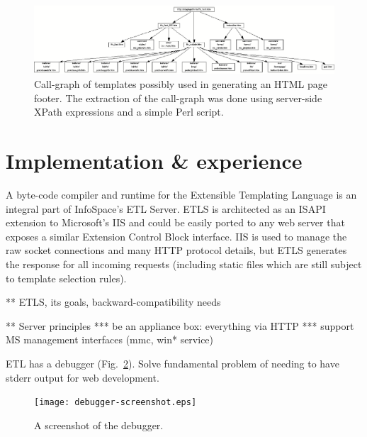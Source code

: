 \documentclass{www2003-submission}
\newcommand{\figref}[1]{Fig.~\ref{fig-#1}}
\begin{document}
\begin{figure}[bt]
\begin{centering}
\hspace*{-.03\linewidth}\includegraphics[width=1.06\linewidth]{ftr_fast-call-graph.eps}
\caption{Call-graph of templates possibly used in generating an HTML
page footer.  The extraction of the call-graph was done using
server-side XPath expressions and a simple Perl script. \label{fig-call-graph}}
\end{centering}
\end{figure}


\section{Implementation \& experience}
\label{sec-implementation}

A byte-code compiler and runtime for the Extensible Templating Language is
an integral part of InfoSpace's ETL Server.  ETLS is architected as an
ISAPI extension to Microsoft's IIS and could be easily ported to any
web server that exposes a similar Extension Control Block interface.
IIS is used to manage the raw socket connections and many HTTP
protocol details, but ETLS generates the response for all incoming
requests (including static files which are still subject to template
selection rules).

** ETLS, its goals, backward-compatibility needs

** Server principles
*** be an appliance box: everything via HTTP
*** support MS management interfaces (mmc, win* service)

ETL has a debugger (\figref{debugger-screenshot}).  Solve fundamental
problem of needing to have stderr output for web development.


\begin{figure}[tb]
\begin{centering}
\hspace*{-0.03\linewidth}\texttt{[image: debugger-screenshot.eps]}
\caption{A screenshot of the debugger.
\label{fig-debugger-screenshot}}
\end{centering}
\end{figure}
\end{document}
